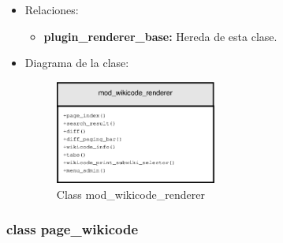 \begin{itemize}
\begin{itemize}
		\end{itemize}
	\item Relaciones:
		\begin{itemize}
			\item \textbf{plugin\_renderer\_base: } Hereda de esta clase.
		\end{itemize}
	\newpage
	\item Diagrama de la clase:
		\begin{figure}[h]
			\centering
			\includegraphics[width=0.5\textwidth]{./img/mod_wikicode_renderer.eps}
			\caption{Class mod\_wikicode\_renderer}
		\end{figure}
\end{itemize}

\subsubsection{class page\_wikicode}

